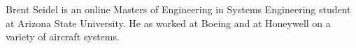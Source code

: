 \documentclass[10pt,journal,letterpaper,compsoc]{IEEEtran}
\begin{document}


\ifCLASSOPTIONcaptionsoff
  \newpage
\fi





%
%
%



% 

\begin{IEEEbiography}{Brent Seidel}
is an online Masters of Engineering in Systems Engineering student at Arizona State University.  He as worked at Boeing and at Honeywell on a variety of aircraft systems.
\end{IEEEbiography}
\end{document}
